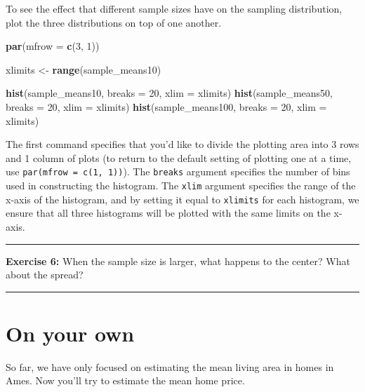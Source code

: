 \documentclass[]{book}
\newenvironment{Shaded}{\begin{snugshade}}{\end{snugshade}}
\newcommand{\KeywordTok}[1]{\textcolor[rgb]{0.13,0.29,0.53}{\textbf{{#1}}}}
\newcommand{\DataTypeTok}[1]{\textcolor[rgb]{0.13,0.29,0.53}{{#1}}}
\newcommand{\DecValTok}[1]{\textcolor[rgb]{0.00,0.00,0.81}{{#1}}}
\newcommand{\StringTok}[1]{\textcolor[rgb]{0.31,0.60,0.02}{{#1}}}
\newcommand{\NormalTok}[1]{{#1}}
\theoremstyle{definition}
\theoremstyle{definition}
\theoremstyle{definition}
\theoremstyle{remark}
\begin{document}
To see the effect that different sample sizes have on the sampling
distribution, plot the three distributions on top of one another.

\begin{Shaded}
\begin{Highlighting}[]
\KeywordTok{par}\NormalTok{(}\DataTypeTok{mfrow =} \KeywordTok{c}\NormalTok{(}\DecValTok{3}\NormalTok{, }\DecValTok{1}\NormalTok{))}

\NormalTok{xlimits <-}\StringTok{ }\KeywordTok{range}\NormalTok{(sample_means10)}

\KeywordTok{hist}\NormalTok{(sample_means10, }\DataTypeTok{breaks =} \DecValTok{20}\NormalTok{, }\DataTypeTok{xlim =} \NormalTok{xlimits)}
\KeywordTok{hist}\NormalTok{(sample_means50, }\DataTypeTok{breaks =} \DecValTok{20}\NormalTok{, }\DataTypeTok{xlim =} \NormalTok{xlimits)}
\KeywordTok{hist}\NormalTok{(sample_means100, }\DataTypeTok{breaks =} \DecValTok{20}\NormalTok{, }\DataTypeTok{xlim =} \NormalTok{xlimits)}
\end{Highlighting}
\end{Shaded}

The first command specifies that you'd like to divide the plotting area
into 3 rows and 1 column of plots (to return to the default setting of
plotting one at a time, use \texttt{par(mfrow\ =\ c(1,\ 1))}). The
\texttt{breaks} argument specifies the number of bins used in
constructing the histogram. The \texttt{xlim} argument specifies the
range of the x-axis of the histogram, and by setting it equal to
\texttt{xlimits} for each histogram, we ensure that all three histograms
will be plotted with the same limits on the x-axis.

\begin{center}\rule{0.5\linewidth}{\linethickness}\end{center}

\textbf{Exercise 6:} When the sample size is larger, what happens to the
center? What about the spread?

\begin{center}\rule{0.5\linewidth}{\linethickness}\end{center}

\section{On your own}\label{on-your-own-3}

So far, we have only focused on estimating the mean living area in homes
in Ames. Now you'll try to estimate the mean home price.
\end{document}
